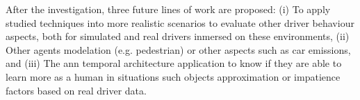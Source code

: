 \begin{fullwidth}
	After the investigation, three future lines of work are proposed: (i) To apply studied techniques into more realistic scenarios to evaluate other driver behaviour aspects, both for simulated and real drivers inmersed on these environments, (ii) Other agents modelation (e.g. pedestrian) or other aspects such as car emissions, and (iii) The \acrlong{ann} temporal architecture application to know if they are able to learn more as a human in situations such objects approximation or impatience factors based on real driver data.
\end{fullwidth}